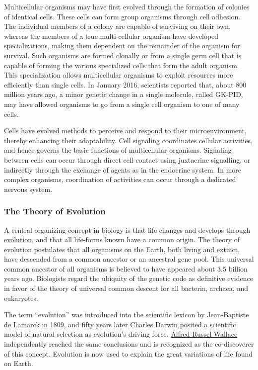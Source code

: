 \documentclass[
]{article}
\begin{document}
Multicellular organisms may have first evolved through the formation of
colonies of identical cells. These cells can form group organisms
through cell adhesion. The individual members of a colony are capable of
surviving on their own, whereas the members of a true multi-cellular
organism have developed specializations, making them dependent on the
remainder of the organism for survival. Such organisms are formed
clonally or from a single germ cell that is capable of forming the
various specialized cells that form the adult organism. This
specialization allows multicellular organisms to exploit resources more
efficiently than single cells. In January 2016, scientists reported
that, about 800 million years ago, a minor genetic change in a single
molecule, called GK-PID, may have allowed organisms to go from a single
cell organism to one of many cells.

Cells have evolved methods to perceive and respond to their
microenvironment, thereby enhancing their adaptability. Cell signaling
coordinates cellular activities, and hence governs the basic functions
of multicellular organisms. Signaling between cells can occur through
direct cell contact using juxtacrine signalling, or indirectly through
the exchange of agents as in the endocrine system. In more complex
organisms, coordination of activities can occur through a dedicated
nervous system.

\hypertarget{the-theory-of-evolution}{%
\subsubsection{The Theory of Evolution}\label{the-theory-of-evolution}}

A central organizing concept in biology is that life changes and
develops through
\href{https://en.wikipedia.org/wiki/Evolution}{evolution}, and that all
life-forms known have a common origin. The theory of evolution
postulates that all organisms on the Earth, both living and extinct,
have descended from a common ancestor or an ancestral gene pool. This
universal common ancestor of all organisms is believed to have appeared
about 3.5 billion years ago. Biologists regard the ubiquity of the
genetic code as definitive evidence in favor of the theory of universal
common descent for all bacteria, archaea, and eukaryotes.

The term ``evolution'' was introduced into the scientific lexicon by
\href{https://en.wikipedia.org/wiki/Jean-Baptiste_Lamarck}{Jean-Baptiste
de Lamarck} in 1809, and fifty years later
\href{https://en.wikipedia.org/wiki/Charles_Darwin}{Charles Darwin}
posited a scientific model of natural selection as evolution's driving
force. \href{https://en.wikipedia.org/wiki/Alfred_Russel_Wallace}{Alfred
Russel Wallace} independently reached the same conclusions and is
recognized as the co-discoverer of this concept. Evolution is now used
to explain the great variations of life found on Earth.
\end{document}
